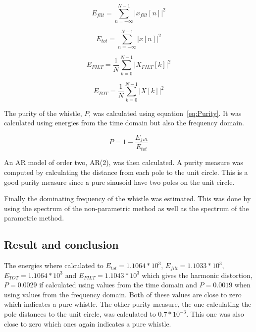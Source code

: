\documentclass[10pt]{article}
\begin{document}
\begin{equation}
  \label{eq:Etimefilt}
  E_{filt} =\sum\limits_{n=-\infty}^{N-1} |x_{filt}[n]|^2
\end{equation}

\begin{equation}
  \label{eq:Etime}
  E_{tot} =\sum\limits_{n=-\infty}^{N-1} |x[n]|^2
\end{equation}

\begin{equation}
  \label{eq:Efeqfilt}
  E_{FILT} =\frac{1}{N}\sum\limits_{k=0}^{N-1} |X_{FILT}[k]|^2
\end{equation}

\begin{equation}
  \label{eq:Efeq}
  E_{TOT} =\frac{1}{N}\sum\limits_{k=0}^{N-1} |X[k]|^2
\end{equation}

The purity of the whistle, $P$, was calculated using equation~\ref{eq:Purity}.
It was calculated using energies from the time domain but also the
frequency domain.

\begin{equation}
  \label{eq:Purity}
  P =1-\frac{E_{filt}}{E_{tot}}
\end{equation}

An AR model of order two, AR(2), was then calculated. A purity measure
was computed by calculating the distance from each pole to the unit
circle. This is a good purity measure since a pure sinusoid have
two poles on the unit circle.

Finally the dominating frequency of the whistle was estimated.
This was done by using the spectrum of the non-parametric method
as well as the spectrum of the parametric method.

\subsection{Result and conclusion}
The energies where calculated to $E_{tot}=1.1064*10^3$, $E_{filt}=1.1033*10^3$,
$E_{TOT}=1.1064*10^3$ and $E_{FILT}=1.1043*10^3$ which gives the harmonic distortion,
$P=0.0029$ if calculated using values from the time domain and $P=0.0019$
when using values from the frequency domain. Both of these values are close to
zero which indicates a pure whistle. The other purity measure, the
one calculating the pole distances to the unit circle, was calculated
to $0.7*10^{-3}$. This one was also close to zero which ones again indicates a
pure whistle.
\end{document}
